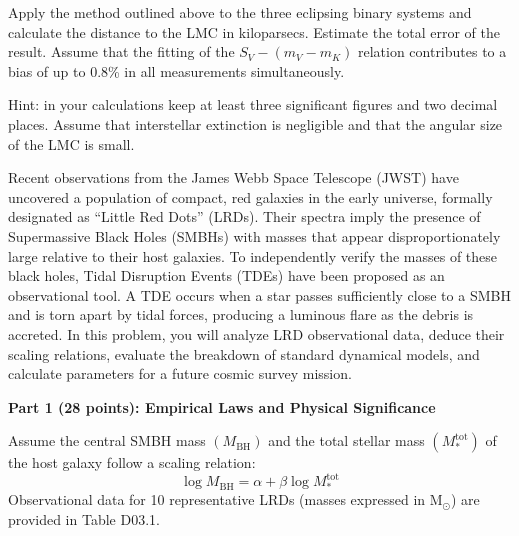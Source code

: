 Apply the method outlined above to the three eclipsing binary systems and
calculate the distance to the LMC in kiloparsecs. Estimate the total error of
the result. Assume that the fitting of the $S_V - (m_V - m_K)$ relation
contributes to a bias of up to 0.8\% in all measurements simultaneously.

Hint: in your calculations keep at least three significant figures and two
decimal places. Assume that interstellar extinction is negligible and that the
angular size of the LMC is small.

Recent observations from the James Webb Space Telescope (JWST) have uncovered
a population of compact, red galaxies in the early universe, formally
designated as ``Little Red Dots'' (LRDs). Their spectra imply the presence of
Supermassive Black Holes (SMBHs) with masses that appear disproportionately
large relative to their host galaxies. To independently verify the masses of
these black holes, Tidal Disruption Events (TDEs) have been proposed as an
observational tool. A TDE occurs when a star passes sufficiently close to a
SMBH and is torn apart by tidal forces, producing a luminous flare as the
debris is accreted. In this problem, you will analyze LRD observational data,
deduce their scaling relations, evaluate the breakdown of standard dynamical
models, and calculate parameters for a future cosmic survey mission.

\medskip\noindent\textbf{Part 1 (28 points): Empirical Laws and Physical Significance}

Assume the central SMBH mass $(M_{\mathrm{BH}})$ and the total stellar mass
$(M_*^{\mathrm{tot}})$ of the host galaxy follow a scaling relation:
\[
\log M_{\mathrm{BH}} = \alpha + \beta \log M_*^{\mathrm{tot}}
\]
Observational data for 10 representative LRDs (masses expressed in
$\mathrm{M}_\odot$) are provided in Table D03.1.

